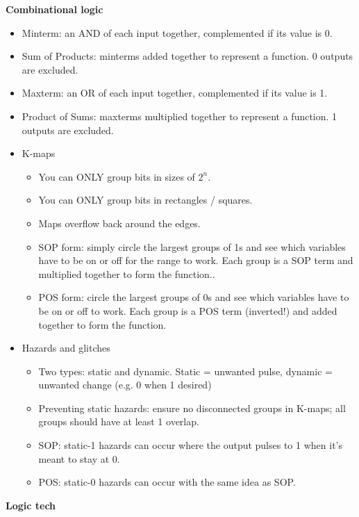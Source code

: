 \documentclass{article}
\begin{document}
\textbf{Combinational logic}
\begin{itemize}
    \item Minterm: an AND of each input together, complemented if its value is 0.
    \item Sum of Products: minterms added together to represent a function. 0 outputs are excluded.
    \item Maxterm: an OR of each input together, complemented if its value is 1.
    \item Product of Sums: maxterms multiplied together to represent a function. 1 outputs are excluded.
    \item K-maps
    \begin{itemize}
        \item You can ONLY group bits in sizes of $2^n$.
        \item You can ONLY group bits in rectangles / squares.
        \item Maps overflow back around the edges.
        \item SOP form: simply circle the largest groups of 1s and see which variables have to be on or off for the range to work. Each group is a SOP term and multiplied together to form the function..
        \item POS form: circle the largest groups of 0s and see which variables have to be on or off to work. Each group is a POS term (inverted!) and added together to form the function.
    \end{itemize}
    \item Hazards and glitches
    \begin{itemize}
        \item Two types: static and dynamic. Static = unwanted pulse, dynamic = unwanted change (e.g. 0 when 1 desired)
        \item Preventing static hazards: ensure no disconnected groups in K-maps; all groups should have at least 1 overlap.
        \item SOP: static-1 hazards can occur where the output pulses to 1 when it's meant to stay at 0.
        \item POS: static-0 hazards can occur with the same idea as SOP.
    \end{itemize}
\end{itemize}
\textbf{Logic tech}
\end{document}
